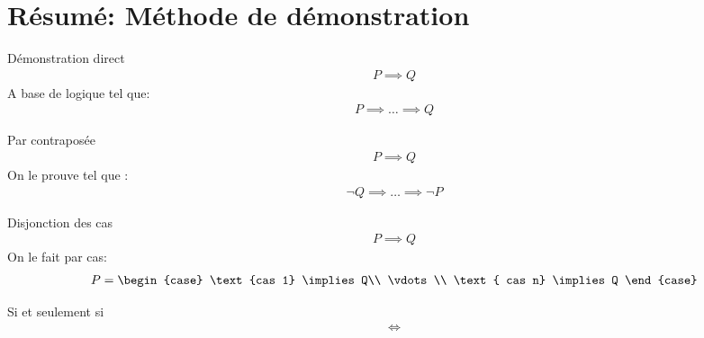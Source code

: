 \section{Résumé: Méthode de démonstration}
\begin{parag}{Démonstration direct}
   \begin{align*} P \implies Q \end{align*}
   A base de logique tel que:
   \begin{align*} P \implies \ldots \implies Q \end{align*}
\end{parag}
\begin{parag}{Par contraposée}
   \begin{align*} P \implies Q \end{align*} 
   On le prouve tel que :
   \begin{align*} \neg Q \implies \ldots \implies \neg P \end{align*}
\end{parag}
\begin{parag}{Disjonction des cas}
    \begin{align*} P \implies Q \end{align*}
    On le fait par cas:
    \begin{align*} 
        P = \begin{case}
            \text{cas 1} \implies Q\\
            \vdots\\
            \text{ cas n} \implies Q
        \end{case}
    \end{align*}
\end{parag}

\begin{parag}{Si et seulement si}
    \begin{align*} \iff \end{align*}
\end{parag}

